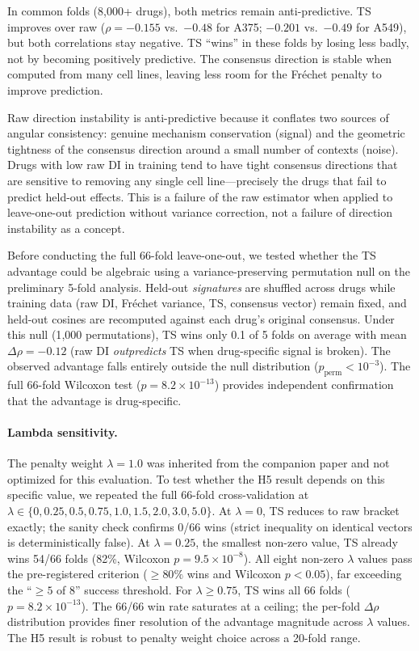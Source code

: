 \documentclass[11pt]{article}
\begin{document}
In common folds (8{,}000+ drugs), both metrics remain
anti-predictive. TS improves over raw ($\rho = -0.155$ vs.\ $-0.48$ for
A375; $-0.201$ vs.\ $-0.49$ for A549), but both correlations stay
negative. TS ``wins'' in these folds by losing less badly, not by becoming
positively predictive. The consensus direction is stable when computed from
many cell lines, leaving less room for the Fr\'{e}chet penalty to
improve prediction.

Raw direction instability is anti-predictive because it conflates two
sources of angular consistency: genuine mechanism conservation (signal)
and the geometric tightness of the consensus direction around a small
number of contexts (noise). Drugs with low raw DI in training tend to
have tight consensus directions that are sensitive to removing any single
cell line---precisely the drugs that fail to predict held-out effects.
This is a failure of the raw estimator when applied to leave-one-out
prediction without variance correction, not a failure of direction
instability as a concept.

Before conducting the full 66-fold leave-one-out, we tested whether the
TS advantage could be algebraic using a variance-preserving permutation
null on the preliminary 5-fold analysis. Held-out
\emph{signatures} are shuffled across drugs while training data
(raw DI, Fr\'echet variance, TS, consensus vector) remain fixed,
and held-out cosines are recomputed against each drug's original
consensus. Under this null (1{,}000 permutations),
TS wins only 0.1 of 5 folds on average with mean $\Delta\rho = -0.12$
(raw DI \emph{outpredicts} TS when drug-specific signal is broken).
The observed advantage falls entirely outside the null distribution
($p_{\text{perm}} < 10^{-3}$). The full 66-fold Wilcoxon test
($p = 8.2 \times 10^{-13}$) provides independent confirmation that the
advantage is drug-specific.

\paragraph{Lambda sensitivity.}
The penalty weight $\lambda = 1.0$ was inherited from the companion paper
and not optimized for this evaluation. To test whether the H5 result depends
on this specific value, we repeated the full 66-fold cross-validation at
$\lambda \in \{0, 0.25, 0.5, 0.75, 1.0, 1.5, 2.0, 3.0, 5.0\}$.
At $\lambda = 0$, TS reduces to raw bracket exactly; the sanity check
confirms 0/66 wins (strict inequality on identical vectors is
deterministically false). At $\lambda = 0.25$, the smallest non-zero value,
TS already wins 54/66 folds (82\%, Wilcoxon $p = 9.5 \times 10^{-8}$). All
eight non-zero $\lambda$ values pass the pre-registered criterion
($\geq 80\%$ wins and Wilcoxon $p < 0.05$), far exceeding the ``$\geq 5$
of 8'' success threshold. For $\lambda \geq 0.75$, TS wins all 66 folds
($p = 8.2 \times 10^{-13}$). The 66/66 win rate saturates at a ceiling; the per-fold $\Delta\rho$
distribution provides finer resolution of the advantage magnitude across
$\lambda$ values.
The H5 result is robust to penalty weight choice across a 20-fold range.
\end{document}
